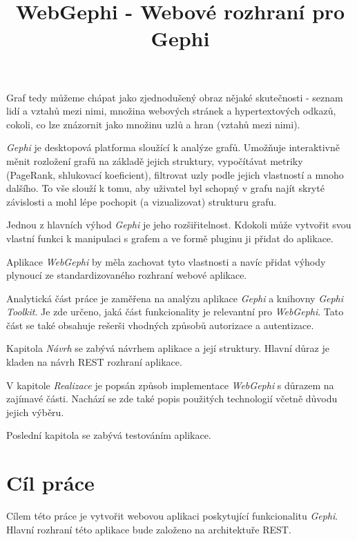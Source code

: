 \documentclass[thesis=M,czech]{FITthesis}[2014/05/6]
\title{WebGephi - Webové rozhraní pro Gephi}
\begin{document}
\begin{introduction}
	\cite{wiki:graf}
		
	Graf tedy můžeme chápat jako zjednodušený obraz nějaké skutečnosti -
	seznam lidí a vztahů mezi nimi, množina webových stránek a hypertextových odkazů, cokoli, co lze znázornit jako množinu uzlů a hran (vztahů mezi nimi).
	
	\textit{Gephi}\cite{gephi} je desktopová platforma sloužící k analýze grafů. Umožňuje interaktivně měnit rozložení grafů na základě jejich struktury, vypočítávat metriky (PageRank, shlukovací koeficient), 
	filtrovat uzly podle jejich vlastností a mnoho dalšího. To vše slouží k tomu, aby uživatel byl schopný v grafu najít skryté závislosti a mohl lépe pochopit (a vizualizovat) strukturu grafu.
	
	Jednou z hlavních výhod \textit{Gephi} je jeho rozšiřitelnost. Kdokoli může vytvořit svou vlastní funkci k manipulaci s grafem a ve formě pluginu ji přidat do aplikace.
	
	Aplikace \textit{WebGephi} by měla zachovat tyto vlastnosti a navíc přidat výhody plynoucí ze standardizovaného rozhraní webové aplikace.
	
	Analytická část práce je zaměřena na analýzu aplikace \textit{Gephi} a knihovny \textit{Gephi Toolkit}. Je zde určeno, jaká část funkcionality je relevantní pro \textit{WebGephi}.
	Tato část se také obsahuje rešerši vhodných způsobů autorizace a autentizace.
	
	Kapitola \textit{Návrh} se zabývá návrhem aplikace a její struktury. Hlavní důraz je kladen na návrh REST rozhraní aplikace.
	
	V kapitole \textit{Realizace} je popsán způsob implementace \textit{WebGephi} s důrazem na zajímavé části. Nachází se zde také popis použitých technologií včetně důvodu jejich výběru.
	
	Poslední kapitola se zabývá testováním aplikace.
\end{introduction}

\chapter{Cíl práce}
Cílem této práce je vytvořit webovou aplikaci poskytující funkcionalitu \textit{Gephi}. Hlavní rozhraní této aplikace bude založeno na architektuře REST.
\end{document}
